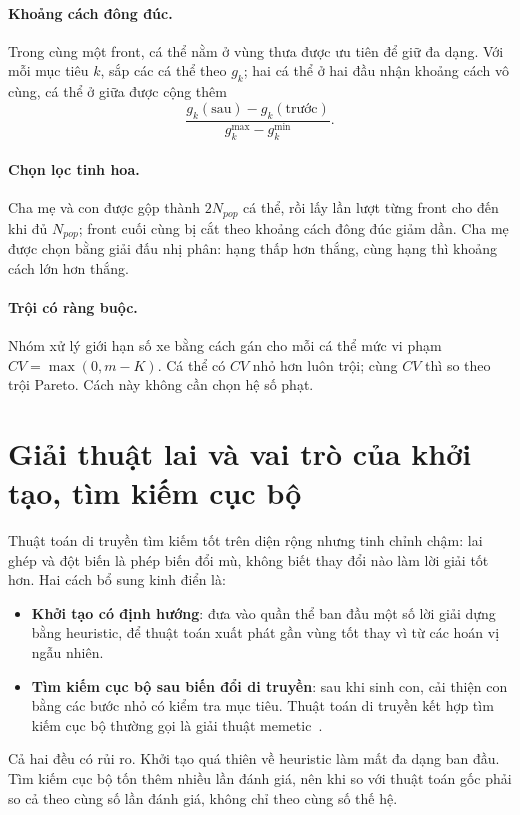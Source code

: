 \paragraph{Khoảng cách đông đúc.} Trong cùng một front, cá thể nằm ở vùng thưa được ưu tiên để giữ đa
dạng. Với mỗi mục tiêu $k$, sắp các cá thể theo $g_k$; hai cá thể ở hai đầu nhận khoảng cách vô cùng,
cá thể ở giữa được cộng thêm
\begin{equation}
  \frac{g_k(\text{sau}) - g_k(\text{trước})}{g_k^{\max} - g_k^{\min}} .
\end{equation}

\paragraph{Chọn lọc tinh hoa.} Cha mẹ và con được gộp thành $2N_{pop}$ cá thể, rồi lấy lần lượt từng
front cho đến khi đủ $N_{pop}$; front cuối cùng bị cắt theo khoảng cách đông đúc giảm dần. Cha mẹ được
chọn bằng giải đấu nhị phân: hạng thấp hơn thắng, cùng hạng thì khoảng cách lớn hơn thắng.

\paragraph{Trội có ràng buộc.} Nhóm xử lý giới hạn số xe bằng cách gán cho mỗi cá thể mức vi phạm
$CV = \max(0, m - K)$. Cá thể có $CV$ nhỏ hơn luôn trội; cùng $CV$ thì so theo trội Pareto. Cách này
không cần chọn hệ số phạt.

\section{Giải thuật lai và vai trò của khởi tạo, tìm kiếm cục bộ}

Thuật toán di truyền tìm kiếm tốt trên diện rộng nhưng tinh chỉnh chậm: lai ghép và đột biến là phép
biến đổi mù, không biết thay đổi nào làm lời giải tốt hơn. Hai cách bổ sung kinh điển là:
\begin{itemize}
  \item \textbf{Khởi tạo có định hướng}: đưa vào quần thể ban đầu một số lời giải dựng bằng heuristic,
        để thuật toán xuất phát gần vùng tốt thay vì từ các hoán vị ngẫu nhiên.
  \item \textbf{Tìm kiếm cục bộ sau biến đổi di truyền}: sau khi sinh con, cải thiện con bằng các bước
        nhỏ có kiểm tra mục tiêu. Thuật toán di truyền kết hợp tìm kiếm cục bộ thường gọi là giải thuật
        memetic~\cite{moscato1989}.
\end{itemize}
Cả hai đều có rủi ro. Khởi tạo quá thiên về heuristic làm mất đa dạng ban đầu. Tìm kiếm cục bộ tốn
thêm nhiều lần đánh giá, nên khi so với thuật toán gốc phải so cả theo cùng số lần đánh giá, không chỉ
theo cùng số thế hệ.

